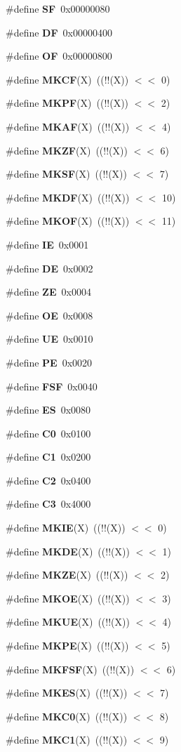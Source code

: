 \begin{CompactItemize}
\item 
\#define {\bf SF}~0x00000080
\item 
\#define {\bf DF}~0x00000400
\item 
\#define {\bf OF}~0x00000800
\item 
\#define {\bf MKCF}(X)~((!!(X)) $<$$<$ 0)
\item 
\#define {\bf MKPF}(X)~((!!(X)) $<$$<$ 2)
\item 
\#define {\bf MKAF}(X)~((!!(X)) $<$$<$ 4)
\item 
\#define {\bf MKZF}(X)~((!!(X)) $<$$<$ 6)
\item 
\#define {\bf MKSF}(X)~((!!(X)) $<$$<$ 7)
\item 
\#define {\bf MKDF}(X)~((!!(X)) $<$$<$ 10)
\item 
\#define {\bf MKOF}(X)~((!!(X)) $<$$<$ 11)
\item 
\#define {\bf IE}~0x0001
\item 
\#define {\bf DE}~0x0002
\item 
\#define {\bf ZE}~0x0004
\item 
\#define {\bf OE}~0x0008
\item 
\#define {\bf UE}~0x0010
\item 
\#define {\bf PE}~0x0020
\item 
\#define {\bf FSF}~0x0040
\item 
\#define {\bf ES}~0x0080
\item 
\#define {\bf C0}~0x0100
\item 
\#define {\bf C1}~0x0200
\item 
\#define {\bf C2}~0x0400
\item 
\#define {\bf C3}~0x4000
\item 
\#define {\bf MKIE}(X)~((!!(X)) $<$$<$ 0)
\item 
\#define {\bf MKDE}(X)~((!!(X)) $<$$<$ 1)
\item 
\#define {\bf MKZE}(X)~((!!(X)) $<$$<$ 2)
\item 
\#define {\bf MKOE}(X)~((!!(X)) $<$$<$ 3)
\item 
\#define {\bf MKUE}(X)~((!!(X)) $<$$<$ 4)
\item 
\#define {\bf MKPE}(X)~((!!(X)) $<$$<$ 5)
\item 
\#define {\bf MKFSF}(X)~((!!(X)) $<$$<$ 6)
\item 
\#define {\bf MKES}(X)~((!!(X)) $<$$<$ 7)
\item 
\#define {\bf MKC0}(X)~((!!(X)) $<$$<$ 8)
\item 
\#define {\bf MKC1}(X)~((!!(X)) $<$$<$ 9)
$$
\end{CompactItemize}
